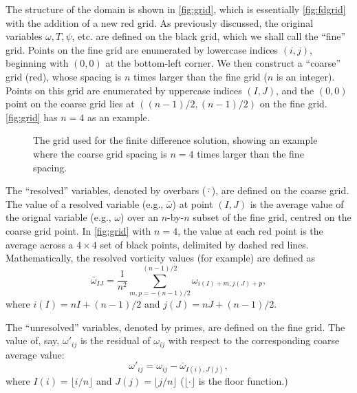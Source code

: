 \documentclass{article}
\begin{document}
The structure of the domain is shown in \autoref{fig:grid}, which is
essentially \autoref{fig:fdgrid} with the addition of a new red grid. As
previously discussed, the original variables $\omega, T, \psi$, etc. are
defined on the black grid, which we shall call the ``fine'' grid. Points on the
fine grid are enumerated by lowercase indices $(i,j)$, beginning with $(0,0)$
at the bottom-left corner. We then construct a ``coarse'' grid (red), whose
spacing is $n$ times larger than the fine grid ($n$ is an integer).
Points on this grid are enumerated by uppercase indices $(I,J)$, and the
$(0,0)$ point on the coarse grid lies at $((n-1)/2,(n-1)/2)$ on the fine grid.
\autoref{fig:grid} has $n=4$ as an example.
\begin{figure}[ht]
    \centering
    
    \caption{
        The grid used for the finite difference solution, showing an example
        where the coarse grid spacing is $n=4$ times larger than the fine
        spacing.
    }
    \label{fig:grid}
\end{figure}

The ``resolved'' variables, denoted by overbars ($\bar{\cdot}$), are defined on
the coarse grid. The value of a resolved variable (e.g., $\bar{\omega}$) at
point $(I,J)$ is the average value of the orignal variable (e.g., $\omega$)
over an $n$-by-$n$ subset of the fine grid, centred on the coarse grid point.
In \autoref{fig:grid} with $n=4$, the value at each red point is the average
across a $4\times4$ set of black points, delimited by dashed red lines.
Mathematically, the resolved vorticity values (for example) are defined as
\begin{equation} \label{eqn:resolved_omega}
    \bar{\omega}_{IJ} = \frac{1}{n^2} \sum_{m,p=-(n-1)/2}^{(n-1)/2}
        \omega_{i(I)+m,j(J)+p},
\end{equation}
where $i(I) = nI + (n-1)/2$ and $j(J) = nJ + (n-1)/2$.

The ``unresolved'' variables, denoted by primes, are defined on the
fine grid. The value of, say, $\omega'_{ij}$ is the residual of $\omega_{ij}$
with respect to the corresponding coarse average value:
\begin{equation} \label{eqn:unresolved_omega}
    \omega'_{ij} = \omega_{ij} - \bar{\omega}_{I(i),J(j)},
\end{equation}
where $I(i) = \lfloor i/n \rfloor$ and $J(j) = \lfloor j/n \rfloor$
($\lfloor \cdot \rfloor$ is the floor function.)
\end{document}
